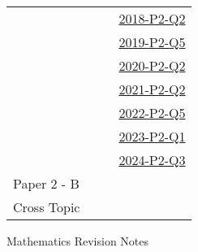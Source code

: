 \documentclass[12pt, a4paper]{article}
\begin{document}
\begin{absolutelynopagebreak}
\begin{center}
\begin{tabular}{|l|c|c|c|}
&  &  & \hyperref[DSE2018-CoreP2-Q02]{2018-P2-Q2} \\
&  &  & \hyperref[DSE2019-CoreP2-Q05]{2019-P2-Q5} \\
&  &  & \hyperref[DSE2020-CoreP2-Q02]{2020-P2-Q2} \\
&  &  & \hyperref[DSE2021-CoreP2-Q02]{2021-P2-Q2} \\
&  &  & \hyperref[DSE2022-CoreP2-Q05]{2022-P2-Q5} \\
&  &  & \hyperref[DSE2023-CoreP2-Q01]{2023-P2-Q1} \\
&  &  & \hyperref[DSE2024-CoreP2-Q03]{2024-P2-Q3} \\
\hline
Paper 2 - B&  &  &  \\
\hline
\hline
Cross Topic&  &  &  \\
\hline
\end{tabular}
\end{center}
\end{absolutelynopagebreak}
\newpage
\newpage
\thispagestyle{empty}
\begin{center}
Mathematics Revision Notes\\\vspace{1cm}
\\\vspace{1cm}
{\fontsize{24pt}{24pt}\selectfont {Approximation and Errors}} \\\vspace{1cm}
\label{chapter:S2-4}

\end{center}
\vspace{0.5cm}
\hline
\end{document}
